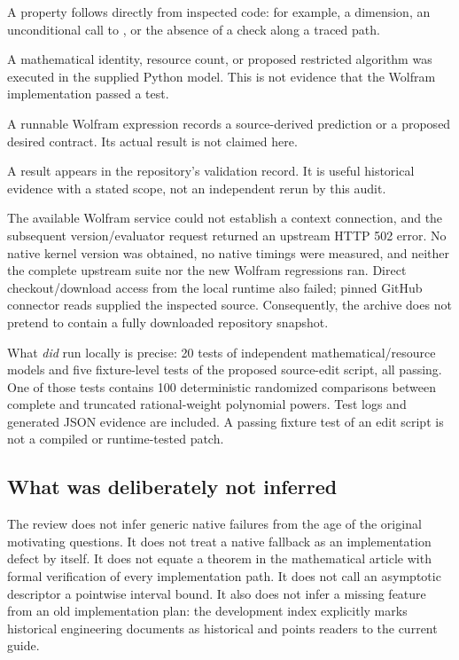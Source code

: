 \documentclass[11pt,a4paper]{article}
\newcommand{\code}[1]{\texttt{\detokenize{#1}}}
\begin{document}
\begin{description}[style=nextline]
\item[Source-confirmed.] A property follows directly from inspected code: for example, a \code{Table} dimension, an unconditional call to \code{indexRegion}, or the absence of a check along a traced path.
\item[Independently checked.] A mathematical identity, resource count, or proposed restricted algorithm was executed in the supplied Python model. This is not evidence that the Wolfram implementation passed a test.
\item[Native probe supplied.] A runnable Wolfram expression records a source-derived prediction or a proposed desired contract. Its actual result is not claimed here.
\item[Upstream-reported.] A result appears in the repository's validation record. It is useful historical evidence with a stated scope, not an independent rerun by this audit.
\end{description}

The available Wolfram service could not establish a context connection, and the subsequent version/evaluator request returned an upstream HTTP 502 error. No native kernel version was obtained, no native timings were measured, and neither the complete upstream suite nor the new Wolfram regressions ran. Direct checkout/download access from the local runtime also failed; pinned GitHub connector reads supplied the inspected source. Consequently, the archive does not pretend to contain a fully downloaded repository snapshot.

What \emph{did} run locally is precise: 20 tests of independent mathematical/resource models and five fixture-level tests of the proposed source-edit script, all passing. One of those tests contains 100 deterministic randomized comparisons between complete and truncated rational-weight polynomial powers. Test logs and generated JSON evidence are included. A passing fixture test of an edit script is not a compiled or runtime-tested patch.

\subsection{What was deliberately not inferred}

The review does not infer generic native failures from the age of the original motivating questions. It does not treat a native \code{Series} fallback as an implementation defect by itself. It does not equate a theorem in the mathematical article with formal verification of every implementation path. It does not call an asymptotic \code{O} descriptor a pointwise interval bound. It also does not infer a missing feature from an old implementation plan: the development index explicitly marks historical engineering documents as historical and points readers to the current guide.\cite{development}
\end{document}
